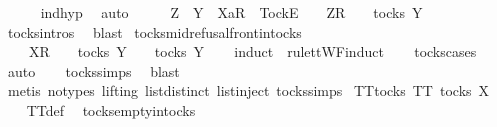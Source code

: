 \begin{isabellebody}
\ \ \ \ \isamarkupfalse%
\ ind{\isacharunderscore}hyp\ \isamarkupfalse%
\ auto\isanewline
\ \ \isamarkupfalse%
\ \isamarkupfalse%
\ {\isachardoublequoteopen}Z\ {\isasymsubseteq}\ Y\ {\isasymLongrightarrow}\ {\isacharbrackleft}Xa{\isacharbrackright}\isactrlsub R\ {\isacharhash}\ {\isacharbrackleft}Tock{\isacharbrackright}\isactrlsub E\ {\isacharhash}\ {\isasymsigma}{\isacharprime}\ {\isacharat}\ {\isacharbrackleft}Z{\isacharbrackright}\isactrlsub R\ {\isacharhash}\ {\isasymsigma}\ {\isasymin}\ tocks\ Y{\isachardoublequoteclose}\isanewline
\ \ \ \ \isamarkupfalse%
\ tocks{\isachardot}intros\ \isamarkupfalse%
\ blast\isanewline
{}\isamarkupfalse%
%
\endisatagproof
{\isafoldproof}%
%
\isadelimproof
\isanewline
%
\endisadelimproof
\isanewline
{}\isamarkupfalse%
\ tocks{\isacharunderscore}mid{\isacharunderscore}refusal{\isacharunderscore}front{\isacharunderscore}in{\isacharunderscore}tocks{\isacharcolon}\isanewline
\ \ {\isachardoublequoteopen}{\isasymrho}\ {\isacharat}\ {\isacharbrackleft}X{\isacharbrackright}\isactrlsub R\ {\isacharhash}\ {\isasymsigma}\ {\isasymin}\ tocks\ Y\ {\isasymLongrightarrow}\ {\isasymrho}\ {\isasymin}\ tocks\ Y{\isachardoublequoteclose}\isanewline
%
\isadelimproof
\ \ %
\endisadelimproof
%
\isatagproof
{}\isamarkupfalse%
\ {\isacharparenleft}induct\ {\isasymrho}\ rule{\isacharcolon}ttWF{\isachardot}induct{\isacharparenright}\isanewline
\ \ \isamarkupfalse%
\ tocks{\isachardot}cases\ \isamarkupfalse%
\ auto\isanewline
\ \ \isamarkupfalse%
\ tocks{\isachardot}simps\ \isamarkupfalse%
\ blast\isanewline
\ \ \isamarkupfalse%
\ {\isacharparenleft}metis\ {\isacharparenleft}no{\isacharunderscore}types{\isacharcomma}\ lifting{\isacharparenright}\ list{\isachardot}distinct{\isacharparenleft}{}{\isacharparenright}\ list{\isachardot}inject\ tocks{\isachardot}simps{\isacharparenright}%
\endisatagproof
{\isafoldproof}%
%
\isadelimproof
\isanewline
%
\endisadelimproof
\isanewline
{}\isamarkupfalse%
\ TT{}{\isacharunderscore}tocks{\isacharcolon}\ {\isachardoublequoteopen}TT{}\ {\isacharparenleft}tocks\ X{\isacharparenright}{\isachardoublequoteclose}\isanewline
%
\isadelimproof
\ \ %
\endisadelimproof
%
\isatagproof
{}\isamarkupfalse%
\ TT{}{\isacharunderscore}def\ \isamarkupfalse%
\ tocks{\isachardot}empty{\isacharunderscore}in{\isacharunderscore}tocks\ \isamarkupfalse%

\end{isabellebody}
